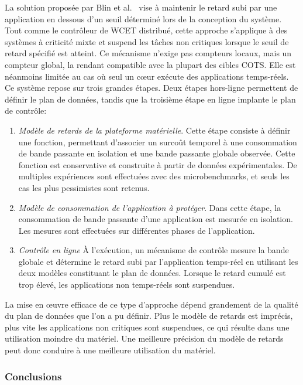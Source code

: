 La solution proposée par Blin et al.~\cite{blin2016maximizing} vise à maintenir le retard subi par une application en dessous d'un seuil déterminé lors de la conception du système.
Tout comme le contrôleur de WCET distribué, cette approche s'applique à des systèmes à criticité mixte et suspend les tâches non critiques lorsque le seuil de retard spécifié est atteint.
Ce mécanisme n'exige pas compteurs locaux, mais un compteur global, la rendant compatible avec la plupart des cibles COTS.
Elle est néanmoins limitée au cas où seul un cœur exécute des applications temps-réels.
Ce système repose sur trois grandes étapes. Deux étapes hors-ligne permettent de définir le plan de données, tandis que la troisième étape en ligne implante le plan de contrôle:
\begin{enumerate}
	\item \emph{Modèle de retards de la plateforme matérielle}. Cette étape consiste à définir une fonction, permettant d'associer un surcoût temporel à une consommation de bande passante en isolation et une bande passante globale observée.
	Cette fonction est conservative et construite à partir de données expérimentales.
	De multiples expériences sont effectuées avec des microbenchmarks, et seuls les cas les plus pessimistes sont retenus.
	\item \emph{Modèle de consommation de l'application à protéger}. Dans cette étape, la consommation de bande passante d'une application est mesurée en isolation.
	Les mesures sont effectuées sur différentes phases de l'application.
	\item \emph{Contrôle en ligne} À l'exécution, un mécanisme de contrôle mesure la bande globale et détermine le retard subi par l'application temps-réel en utilisant les deux modèles constituant le plan de données.
	Lorsque le retard cumulé est trop élevé, les applications non temps-réels sont suspendues.
\end{enumerate}

La mise en œuvre efficace de ce type d'approche dépend grandement de la qualité du plan de données que l'on a pu définir.
Plus le modèle de retards est imprécis, plus vite les applications non critiques sont suspendues, ce qui résulte dans une utilisation moindre du matériel.
Une meilleure précision du modèle de retards peut donc conduire à une meilleure utilisation du matériel.

\subsubsection{Conclusions}

